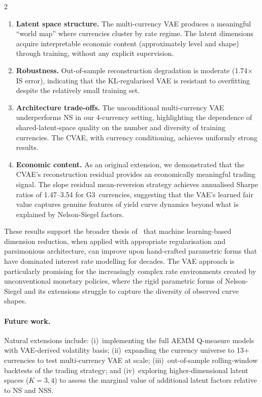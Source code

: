 \documentclass[10pt,a4paper]{article}
\theoremstyle{plain}
\theoremstyle{definition}
\begin{document}
\begin{multicols}{2}
\begin{enumerate}[nosep]
\item \textbf{Latent space structure.} The multi-currency VAE produces a meaningful ``world map'' where currencies cluster by rate regime. The latent dimensions acquire interpretable economic content (approximately level and shape) through training, without any explicit supervision.

\item \textbf{Robustness.} Out-of-sample reconstruction degradation is moderate (1.74$\times$ IS error), indicating that the KL-regularised VAE is resistant to overfitting despite the relatively small training set.

\item \textbf{Architecture trade-offs.} The unconditional multi-currency VAE underperforms NS in our 4-currency setting, highlighting the dependence of shared-latent-space quality on the number and diversity of training currencies. The CVAE, with currency conditioning, achieves uniformly strong results.

\item \textbf{Economic content.} As an original extension, we demonstrated that the CVAE's reconstruction residual provides an economically meaningful trading signal. The slope residual mean-reversion strategy achieves annualised Sharpe ratios of 1.47--3.54 for G3~currencies, suggesting that the VAE's learned fair value captures genuine features of yield curve dynamics beyond what is explained by Nelson-Siegel factors.
\end{enumerate}

These results support the broader thesis of~\cite{sokol2022} that machine learning-based dimension reduction, when applied with appropriate regularisation and parsimonious architecture, can improve upon hand-crafted parametric forms that have dominated interest rate modelling for decades. The VAE approach is particularly promising for the increasingly complex rate environments created by unconventional monetary policies, where the rigid parametric forms of Nelson-Siegel and its extensions struggle to capture the diversity of observed curve shapes.

\paragraph{Future work.} Natural extensions include: (i)~implementing the full AEMM Q-measure models with VAE-derived volatility basis; (ii)~expanding the currency universe to 13+ currencies to test multi-currency VAE at scale; (iii)~out-of-sample rolling-window backtests of the trading strategy; and (iv)~exploring higher-dimensional latent spaces ($K=3,4$) to assess the marginal value of additional latent factors relative to NS and NSS.

\end{multicols}
\end{document}
